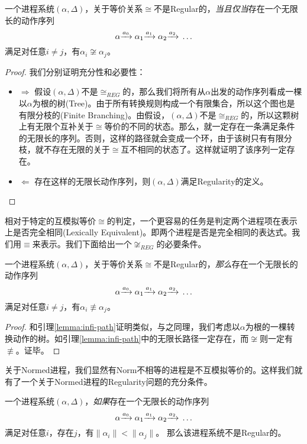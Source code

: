 \begin{lem}\label{lemma:infi-path}
一个进程系统$(\alpha,\Delta)$，关于等价关系$\cong$不是Regular的，\emph{当且仅当}存在一个无限长的动作序列
$$\alpha{\xrightarrow{a_0}{}}\alpha_1{\xrightarrow{a_1}{}}\alpha_2{\xrightarrow{a_2}{}}\ldots$$ 
满足对任意$i\neq j$，有$\alpha_i\not\cong\alpha_j$。
\end{lem}

\begin{proof}
我们分别证明充分性和必要性：
\begin{itemize}
	\item $\Rightarrow$ 假设$(\alpha,\Delta)$不是$\cong_{REG}$的，那么我们将所有从$\alpha$出发的动作序列看成一棵以$\alpha$为根的树(Tree)。由于所有转换规则构成一个有限集合，所以这个图也是有限分枝的(Finite Branching)。由假设，$(\alpha,\Delta)$不是$\cong_{REG}$的，所以这颗树上有无限个互补关于$\cong$等价的不同的状态。那么，就一定存在一条满足条件的无限长的序列。否则，这样的路径就会变成一个环，由于该树只有有限分枝，就不存在无限的关于$\cong$互不相同的状态了。这样就证明了该序列一定存在。
	\item $\Leftarrow$ 存在这样的无限长动作序列，则$(\alpha,\Delta)$满足Regularity的定义。
\end{itemize}
\end{proof}

相对于特定的互模拟等价$\cong$的判定，一个更容易的任务是判定两个进程项在表示上是否完全相同(Lexically Equivalent)。即两个进程是否是完全相同的表达式。我们用$\equiv$来表示。我们下面给出一个$\not\cong_{REG}$的必要条件。

\begin{lem}\label{lemma:infi-path-2}
一个进程系统$(\alpha,\Delta)$，关于等价关系$\cong$不是Regular的，\emph{那么}存在一个无限长的动作序列
$$\alpha{\xrightarrow{a_0}{}}\alpha_1{\xrightarrow{a_1}{}}\alpha_2{\xrightarrow{a_2}{}}\ldots$$ 
满足对任意$i\neq j$，有$\alpha_i\not\equiv\alpha_j$。
\end{lem}

\begin{proof}
和引理\ref{lemma:infi-path}证明类似，与之同理，我们考虑以$\alpha$为根的一棵转换动作的树。如引理\ref{lemma:infi-path}中的无限长路径一定存在，而$\not\cong$则一定有$\not\equiv$。证毕。
\end{proof}

关于Normed进程，我们显然有Norm不相等的进程是不互模拟等价的。这样我们就有了一个关于Normed进程的Regularity问题的充分条件。

\begin{lem}\label{lamma:infi-path-3}
一个进程系统$(\alpha,\Delta)$，\emph{如果}存在一个无限长的动作序列
$$\alpha{\xrightarrow{a_0}{}}\alpha_1{\xrightarrow{a_1}{}}\alpha_2{\xrightarrow{a_2}{}}\ldots$$ 
满足对任意$i$，存在$j$，有$\|\alpha_i\|<\|\alpha_j\|$。
那么该进程系统不是Regular的。
\end{lem}

